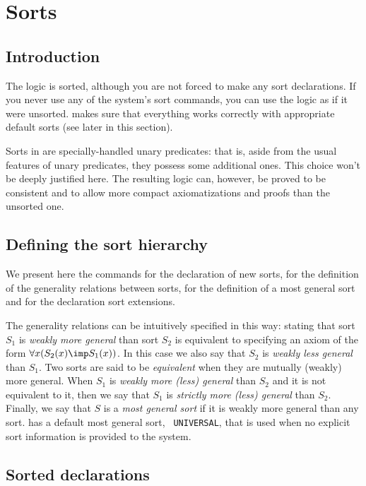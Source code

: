 \section{Sorts}
\label{sec-sort}

\subsection{Introduction}

The {\GF} logic is sorted, although you are not forced to make any
sort declarations.
If you never use any of the system's sort commands, you can use the 
logic as if it were unsorted. {\GF} makes sure that everything works correctly
with appropriate default sorts
(see later in this section).

Sorts in {\GF} are specially-handled unary predicates: that is, aside from the
usual features of unary predicates, they possess some additional ones.
This choice won't be deeply justified here.
The resulting logic can, however, be proved to be 
consistent and to allow more compact axiomatizations and proofs
than the unsorted one.

\subsection{Defining the sort hierarchy}
We present here the commands for the declaration of new sorts, for the
definition of the generality relations between sorts, for the definition
of a most general sort and for the declaration sort extensions.


The generality relations can be intuitively specified in this way:
stating that sort $S_1$ is {\it weakly more general} than sort $S_2$
is equivalent to
specifying an axiom of the form $\forall x(S_2(x) \imp S_1(x))$.
In this case we also say that $S_2$ is {\it weakly less general} than $S_1$.
Two sorts are said to be {\it equivalent} when they are mutually
(weakly) more general.
When $S_1$ is {\it weakly more (less) general} than $S_2$ and it is not
equivalent to it, then we say that $S_1$ is {\it strictly more (less)
general} than $S_2$.
Finally, we say that $S$ is a {\em most general sort} if it is weakly more
general than any sort. {\GF} has a default most general sort, {\tt
UNIVERSAL}, that is used when no explicit sort information is provided to
the system.

\subsection{Sorted declarations}

